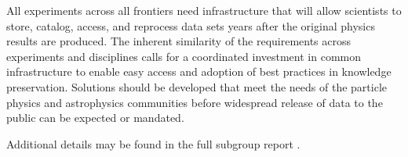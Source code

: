All experiments across all frontiers
need  infrastructure that will allow scientists to store, catalog,
access, and  reprocess data sets years after the original physics
results are produced.  The inherent similarity of the requirements
across experiments and disciplines  calls for a coordinated investment
in common infrastructure to enable easy  access and adoption of best
practices in knowledge preservation.  Solutions  should be developed
that meet the needs of the particle physics and astrophysics  communities
before widespread release of data to the public can be expected  or
mandated.

Additional details may be found in the full subgroup report \cite{Butler:2013kka}.

